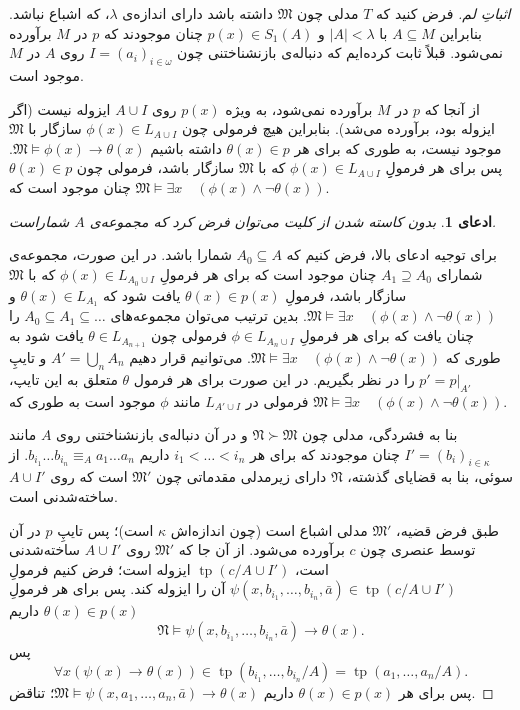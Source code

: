 \documentclass[12pt,a4paper]{report}
\theoremstyle{colorhead}
\newtheorem{claim}[thm]{ادعای}
\DeclareMathOperator{\tp}{tp}
\begin{document}
\begin{proof}[اثباتِ لم]
	فرض کنید که
	$T$
	مدلی چون
	$\mathfrak{M}$
	داشته باشد دارای اندازه‌ی
	$\lambda$،
	که اشباع نباشد. بنابراین
	$A\subseteq M$
با
	$|A|<\lambda$
	و
	$p(x)\in S_1(A)$
	چنان موجودند که 
	$p$
	در
	$M$
	برآورده نمی‌شود. قبلاً ثابت کرده‌ایم که دنباله‌ی بازنشناختنی چون
	$I=(a_i)_{i\in \omega}$
	روی
	$A$
	در
	$M$
	موجود است. 
	\par 
	از آنجا که 
	$p$
	در
	$M$
	برآورده نمی‌شود، به ویژه
	$p(x)$
	روی
$A\cup I$
ایزوله نیست (اگر ایزوله بود، برآورده می‌شد).
 بنابراین هیچ فرمولی چون
$\phi(x)\in L_{A\cup I}$
سازگار با
$\mathfrak{M}$
موجود نیست، به طوری که برای هر
$\theta(x)\in p$
داشته باشیم
$\mathfrak{M}\models \phi(x)\to \theta(x)$.
پس برای هر فرمولِِ
$\phi(x)\in L_{A\cup I}$
که با
$\mathfrak{M}$
سازگار باشد، فرمولی چون
$\theta(x)\in p$
چنان موجود است که 
$\mathfrak{M}\models \exists x\quad (\phi(x)\wedge \neg \theta(x))$.
\begin{claim}
	بدون کاسته شدن از کلیت می‌توان فرض کرد که مجموعه‌ی
	$A$
	شماراست.  
	\end{claim}
برای توجیه ادعای بالا، فرض کنیم که
$A_0\subseteq A$
شمارا باشد. در این صورت، مجموعه‌ی شمارای 
$A_1\supseteq A_0$
چنان موجود است که برای هر فرمولِ
$\phi(x)\in L_{A_0\cup I}$
که با
$\mathfrak{M}$
سازگار باشد، فرمولِ
$\theta(x)\in p(x)$
یافت شود که
$\theta(x)\in L_{A_1}$
و
$\mathfrak{M}\models \exists x\quad (\phi(x)\wedge \neg \theta(x))$.
بدین ترتیب می‌توان مجموعه‌های
$A_0\subseteq A_1\subseteq \ldots$
را چنان یافت که برای هر فرمولِ
$\phi\in L_{A_n\cup I}$
فرمولی چون
$\theta\in L_{A_{n+1}}$
یافت شود به طوری که
$\mathfrak{M}\models \exists x\quad (\phi(x)\wedge \neg \theta(x))$.
می‌توانیم قرار دهیم
$A'=\bigcup_{n}A_n$
و تایپِ
$p'=p|_{A'}$
را در نظر بگیریم. در این صورت برای هر فرمول 
$\theta$
متعلق به این تایپ، فرمولی در
$L_{A'\cup I}$
مانند
$\phi$
موجود است به طوری که
$\mathfrak{M}\models \exists x\quad (\phi(x)\wedge \neg \theta(x))$.
\par 
بنا به فشردگی، مدلی چون
$\mathfrak{N}\succ \mathfrak{M}$
و در آن دنباله‌ی بازنشناختنی 
روی
$A$
مانند
$I'=(b_i)_{i\in \kappa}$
چنان موجودند که برای هر
$i_1<\ldots<i_n$
داریم
$b_{i_1}\ldots b_{i_n}\equiv_A a_1\ldots a_n$.
از سوئی، بنا به قضایای گذشته، 
$\mathfrak{N}$
دارای زیرمدلی مقدماتی چون
$\mathfrak{M}'$
است که روی
$A\cup I'$
ساخته‌شدنی است. 
\par 
طبق فرض قضیه، 
$\mathfrak{M}'$
مدلی اشباع است
(چون اندازه‌اش
$\kappa$
است)؛
 پس تایپِ
$p$
در آن 
توسط عنصری چون
$c$
برآورده می‌شود. از آن جا که
$\mathfrak{M}'$
روی
$A\cup I'$
ساخته‌شدنی است،
$\tp(c/A\cup I')$
ایزوله است؛ فرض کنیم فرمولِ
$\psi(x,b_{i_1},\ldots,b_{i_n},\bar{a})\in \tp(c/A\cup I')$
آن را ایزوله کند. پس برای هر فرمولِ
$\theta(x)\in p(x)$
داریم
\[
\mathfrak{N}\models 
\psi(x,b_{i_1},\ldots,b_{i_n},\bar{a})\to \theta(x).
\]
پس 
\[
\forall x(\psi(x)\to \theta(x))\in \tp 
(b_{i_1},\ldots,b_{i_n}/A)=\tp(a_1,\ldots,a_n/A).\]
پس برای هر
$\theta(x)\in p(x)$
داریم
$\mathfrak{M}\models \psi(x,a_1,\ldots,a_n,\bar{a})\to \theta(x)$؛
تناقض.
	\end{proof}
\end{document}
